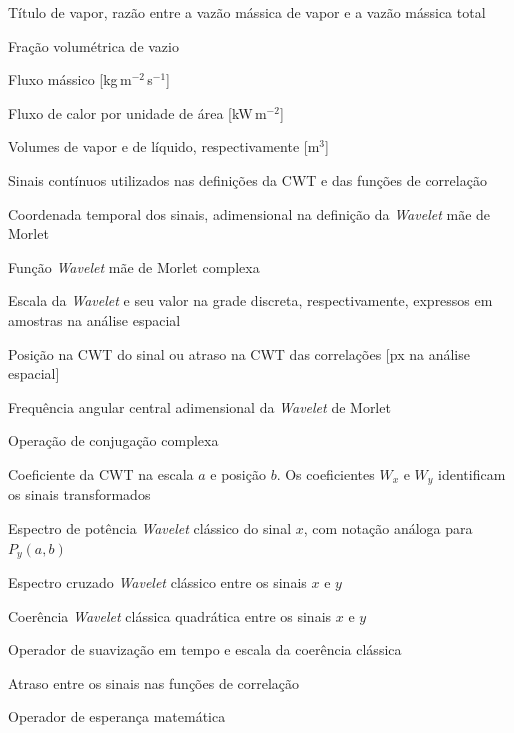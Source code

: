 \begin{simbolos}
  \item[$x$] Título de vapor, razão entre a vazão mássica de vapor e a vazão
  mássica total
  \item[$\alpha$] Fração volumétrica de vazio
  \item[$G$] Fluxo mássico [kg\,m$^{-2}$\,s$^{-1}$]
  \item[$q''$] Fluxo de calor por unidade de área [kW\,m$^{-2}$]
  \item[$V_v$, $V_l$] Volumes de vapor e de líquido, respectivamente [m$^3$]
  \item[$x(t)$, $y(t)$] Sinais contínuos utilizados nas definições da CWT e
  das funções de correlação
  \item[$t$] Coordenada temporal dos sinais, adimensional na definição
  da \textit{Wavelet} mãe de Morlet
  \item[$\psi(t)$] Função \textit{Wavelet} mãe de Morlet complexa
  \item[$a$, $a_k$] Escala da \textit{Wavelet} e seu valor na grade discreta,
  respectivamente, expressos em amostras na análise espacial
  \item[$b$] Posição na CWT do sinal ou atraso na CWT das correlações
  [px na análise espacial]
  \item[$\omega_0$] Frequência angular central adimensional da \textit{Wavelet} de Morlet
  \item[$(\cdot)^*$] Operação de conjugação complexa
  \item[$W(a,b)$] Coeficiente da CWT na escala $a$ e posição $b$.
  Os coeficientes $W_x$ e $W_y$ identificam os sinais transformados
  \item[$P_x(a,b)$] Espectro de potência \textit{Wavelet} clássico do sinal $x$,
  com notação análoga para $P_y(a,b)$
  \item[$C_{xy}(a,b)$] Espectro cruzado \textit{Wavelet} clássico entre os sinais $x$ e $y$
  \item[$\gamma_{xy}(a,b)$] Coerência \textit{Wavelet} clássica quadrática entre os sinais $x$ e $y$
  \item[{$S[\cdot]$}] Operador de suavização em tempo e escala da coerência clássica
  \item[$\tau$] Atraso entre os sinais nas funções de correlação
  \item[$\operatorname{E}\{\cdot\}$] Operador de esperança matemática

\end{simbolos}
